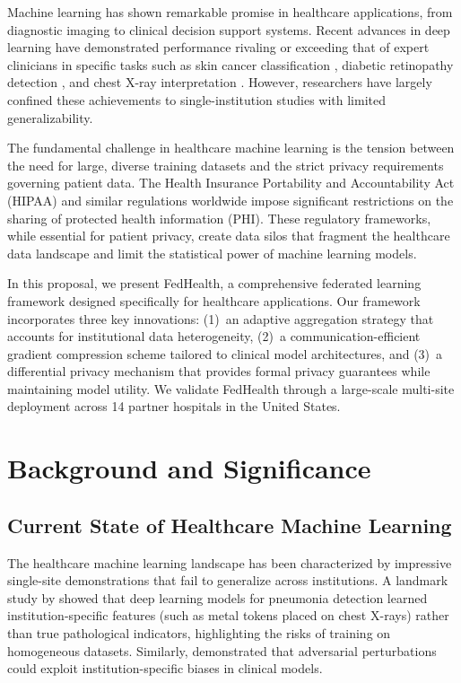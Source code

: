 \documentclass[12pt,letterpaper]{article}
\begin{document}
Machine learning has shown remarkable promise in healthcare applications, from diagnostic imaging to clinical decision support systems. Recent advances in deep learning have demonstrated performance rivaling or exceeding that of expert clinicians in specific tasks such as skin cancer classification \citep{Esteva2017}, diabetic retinopathy detection \citep{Gulshan2016}, and chest X-ray interpretation \citep{Rajpurkar2018}. However, researchers have largely confined these achievements to single-institution studies with limited generalizability.

The fundamental challenge in healthcare machine learning is the tension between the need for large, diverse training datasets and the strict privacy requirements governing patient data. The Health Insurance Portability and Accountability Act (HIPAA) and similar regulations worldwide impose significant restrictions on the sharing of protected health information (PHI). These regulatory frameworks, while essential for patient privacy, create data silos that fragment the healthcare data landscape and limit the statistical power of machine learning models.

In this proposal, we present FedHealth, a comprehensive federated learning framework designed specifically for healthcare applications. Our framework incorporates three key innovations: (1)~an adaptive aggregation strategy that accounts for institutional data heterogeneity, (2)~a communication-efficient gradient compression scheme tailored to clinical model architectures, and (3)~a differential privacy mechanism that provides formal privacy guarantees while maintaining model utility. We validate FedHealth through a large-scale multi-site deployment across 14 partner hospitals in the United States.

\section{Background and Significance}
\label{sec:background}

\subsection{Current State of Healthcare Machine Learning}

The healthcare machine learning landscape has been characterized by impressive single-site demonstrations that fail to generalize across institutions. A landmark study by \citet{Zech2018} showed that deep learning models for pneumonia detection learned institution-specific features (such as metal tokens placed on chest X-rays) rather than true pathological indicators, highlighting the risks of training on homogeneous datasets. Similarly, \citet{Finlayson2019} demonstrated that adversarial perturbations could exploit institution-specific biases in clinical models.
\end{document}
